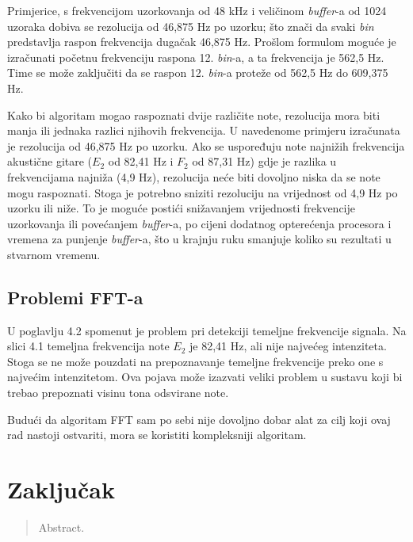 \documentclass[times, utf8, zavrsni, numeric]{fer}
\begin{document}
Primjerice, s frekvencijom uzorkovanja od 48 kHz i veličinom \textit{buffer}-a od 1024 uzoraka dobiva se rezolucija od 46,875 Hz po uzorku; što znači da svaki \textit{bin} predstavlja raspon frekvencija dugačak 46,875 Hz. Prošlom formulom moguće je izračunati početnu frekvenciju raspona 12. \textit{bin}-a, a ta frekvencija je 562,5 Hz. Time se može zaključiti da se raspon 12. \textit{bin}-a proteže od 562,5 Hz do 609,375 Hz.

Kako bi algoritam mogao raspoznati dvije različite note, rezolucija mora biti manja ili jednaka razlici njihovih frekvencija.
U navedenome primjeru izračunata je rezolucija od 46,875 Hz po uzorku. Ako se uspoređuju note najnižih frekvencija akustične gitare ($E_2$ od 82,41 Hz i $F_2$ od 87,31 Hz) gdje je razlika u frekvencijama najniža (4,9 Hz), rezolucija neće biti dovoljno niska da se note mogu raspoznati. Stoga je potrebno sniziti rezoluciju na vrijednost od 4,9 Hz po uzorku ili niže. To je moguće postići snižavanjem vrijednosti frekvencije uzorkovanja ili povećanjem \textit{buffer}-a, po cijeni dodatnog opterećenja procesora i vremena za punjenje \textit{buffer}-a, što u krajnju ruku smanjuje koliko su rezultati u stvarnom vremenu.

\section{Problemi FFT-a}
U poglavlju 4.2 spomenut je problem pri detekciji temeljne frekvencije signala. Na slici 4.1 temeljna frekvencija note $E_2$ je 82,41 Hz, ali nije najvećeg intenziteta. Stoga se ne može pouzdati na prepoznavanje temeljne frekvencije preko one s najvećim intenzitetom. Ova pojava može izazvati veliki problem u sustavu koji bi trebao prepoznati visinu tona odsvirane note.

Budući da algoritam FFT sam po sebi nije dovoljno dobar alat za cilj koji ovaj rad nastoji ostvariti, mora se koristiti kompleksniji algoritam.


\chapter{Zaključak}




\begin{sazetak}

\end{sazetak}

\begin{abstract}
Abstract.

\end{abstract}
\end{document}
